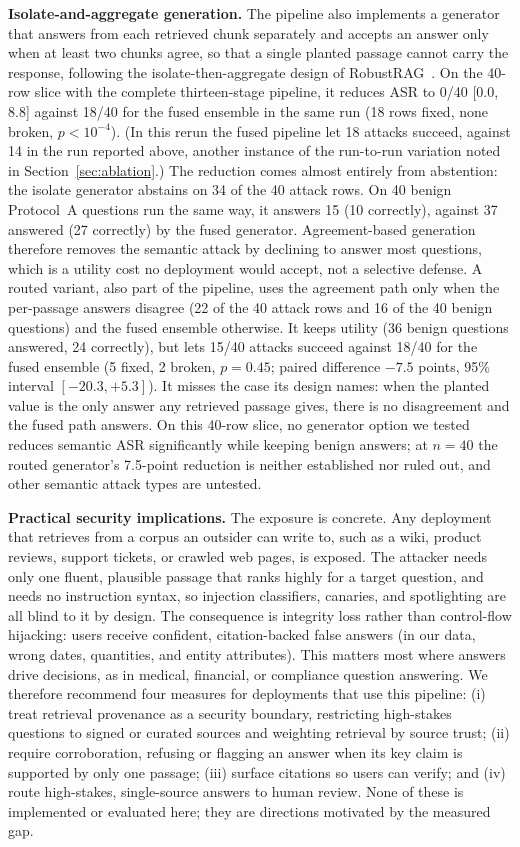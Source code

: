 \documentclass[conference]{IEEEtran}
\begin{document}
\textbf{Isolate-and-aggregate generation.} The pipeline also implements a generator that answers from each retrieved chunk separately and accepts an answer only when at least two chunks agree, so that a single planted passage cannot carry the response, following the isolate-then-aggregate design of RobustRAG~\cite{xiang2024robustrag}. On the 40-row slice with the complete thirteen-stage pipeline, it reduces ASR to 0/40 [0.0, 8.8] against 18/40 for the fused ensemble in the same run (18 rows fixed, none broken, $p<10^{-4}$). (In this rerun the fused pipeline let 18 attacks succeed, against 14 in the run reported above, another instance of the run-to-run variation noted in Section~\ref{sec:ablation}.) The reduction comes almost entirely from abstention: the isolate generator abstains on 34 of the 40 attack rows. On 40 benign Protocol~A questions run the same way, it answers 15 (10 correctly), against 37 answered (27 correctly) by the fused generator. Agreement-based generation therefore removes the semantic attack by declining to answer most questions, which is a utility cost no deployment would accept, not a selective defense. A routed variant, also part of the pipeline, uses the agreement path only when the per-passage answers disagree (22 of the 40 attack rows and 16 of the 40 benign questions) and the fused ensemble otherwise. It keeps utility (36 benign questions answered, 24 correctly), but lets 15/40 attacks succeed against 18/40 for the fused ensemble (5 fixed, 2 broken, $p=0.45$; paired difference $-7.5$ points, 95\% interval $[-20.3, +5.3]$). It misses the case its design names: when the planted value is the only answer any retrieved passage gives, there is no disagreement and the fused path answers. On this 40-row slice, no generator option we tested reduces semantic ASR significantly while keeping benign answers; at $n=40$ the routed generator's 7.5-point reduction is neither established nor ruled out, and other semantic attack types are untested.

\textbf{Practical security implications.} The exposure is concrete. Any deployment that retrieves from a corpus an outsider can write to, such as a wiki, product reviews, support tickets, or crawled web pages, is exposed. The attacker needs only one fluent, plausible passage that ranks highly for a target question, and needs no instruction syntax, so injection classifiers, canaries, and spotlighting are all blind to it by design. The consequence is integrity loss rather than control-flow hijacking: users receive confident, citation-backed false answers (in our data, wrong dates, quantities, and entity attributes). This matters most where answers drive decisions, as in medical, financial, or compliance question answering. We therefore recommend four measures for deployments that use this pipeline: (i) treat retrieval provenance as a security boundary, restricting high-stakes questions to signed or curated sources and weighting retrieval by source trust; (ii) require corroboration, refusing or flagging an answer when its key claim is supported by only one passage; (iii) surface citations so users can verify; and (iv) route high-stakes, single-source answers to human review. None of these is implemented or evaluated here; they are directions motivated by the measured gap.
\end{document}
